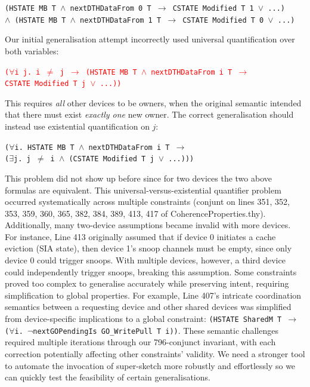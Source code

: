 \documentclass[10pt,conference]{IEEEtran}
\begin{document}
\begin{isabelle}
\textcolor{colorDELETEDfg}{\texttt{(HSTATE MB T $\land$ nextDTHDataFrom 0 T $\rightarrow$ CSTATE Modified T 1 $\lor$ ...)}}\\
\textcolor{colorDELETEDfg}{\texttt{$\land$ (HSTATE MB T $\land$ nextDTHDataFrom 1 T $\rightarrow$ CSTATE Modified T 0 $\lor$ ...)}}
\end{isabelle}

Our initial generalisation attempt incorrectly used universal quantification over both variables:
\begin{isabelle}
\textcolor{red}{\texttt{($\forall$i j. i $\neq$ j $\rightarrow$ (HSTATE MB T $\land$ nextDTHDataFrom i T $\rightarrow$}}\\
\textcolor{red}{\hspace{2em}\texttt{CSTATE Modified T j $\lor$ ...))}}
\end{isabelle}

This requires \emph{all} other devices to be owners, when the original semantic intended that there must exist \emph{exactly one} new owner. The correct generalisation should instead use existential quantification on $j$:
\begin{isabelle}
\textcolor{colorADDEDfg}{\texttt{($\forall$i. HSTATE MB T $\land$ nextDTHDataFrom i T $\rightarrow$}}\\
\textcolor{colorADDEDfg}{\hspace{2em}\texttt{($\exists$j. j $\neq$ i $\land$ (CSTATE Modified T j $\lor$ ...)))}}
\end{isabelle}
This problem did not show up before since for two devices the two above formulas are equivalent.
This universal-versus-existential quantifier problem occurred systematically across multiple constraints (conjunt on lines 351, 352, 353, 359, 360, 365, 382, 384, 389, 413, 417 of CoherenceProperties.thy). Additionally, many two-device assumptions became invalid with more devices. For instance, Line 413 originally assumed that if device 0 initiates a cache eviction (SIA state), then device 1's snoop channels must be empty, since only device 0 could trigger snoops. With multiple devices, however, a third device could independently trigger snoops, breaking this assumption. Some constraints proved too complex to generalise accurately while preserving intent, requiring simplification to global properties. For example, Line 407's intricate coordination semantics between a requesting device and other shared devices was simplified from device-specific implications to a global constraint: \texttt{(HSTATE SharedM T $\rightarrow$ ($\forall$i. $\neg$nextGOPendingIs GO\_WritePull T i))}. These semantic challenges required multiple iterations through our 796-conjunct invariant, with each correction potentially affecting other constraints' validity. We need a stronger tool to automate the invocation of super-sketch more robustly and effortlessly so we can quickly test the feasibility of certain generalisations.
\end{document}
